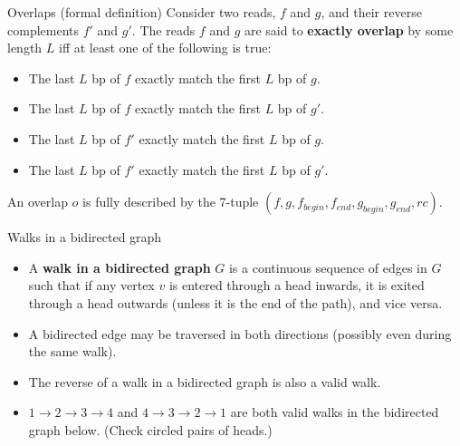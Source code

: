 \documentclass[xcolor=dvipsnames]{beamer}
\newcommand{\LengthVar}{L}
\begin{document}
\begin{frame}{Overlaps (formal definition)}
    Consider two reads, $f$ and $g$, and their reverse complements $f'$ and $g'$.
    The reads $f$ and $g$ are said to {\bf exactly overlap} by some length
    $\LengthVar$ iff at least one of the following is true:
    \begin{itemize}
        \item The last $\LengthVar$ bp of $f$ exactly match the first
        $\LengthVar$ bp of $g$.
        \item The last $\LengthVar$ bp of $f$ exactly match the first
        $\LengthVar$ bp of $g'$.
        \item The last $\LengthVar$ bp of $f'$ exactly match the first
        $\LengthVar$ bp of $g$.
        \item The last $\LengthVar$ bp of $f'$ exactly match the first
        $\LengthVar$ bp of $g'$.
    \end{itemize}
    An overlap $o$ is fully described by the 7-tuple $(f, g, f_{begin}, f_{end},
    g_{begin}, g_{end}, rc)$.
\end{frame}

\begin{frame}{Walks in a bidirected graph}
    \begin{itemize}
        \item A {\bf walk in a bidirected graph} $G$ is a continuous sequence of
        edges in $G$ such that if any vertex $v$ is entered through a head
        inwards, it is exited through a head outwards (unless it is the end of the
        path), and vice versa.
        \item A bidirected edge may be traversed in both directions
        (possibly even during the same walk).
        \item The reverse of a walk in a bidirected graph is also a
        valid walk.
        \item $1 \to 2 \to 3 \to 4$ and $4 \to 3 \to 2 \to 1$ are both valid
        walks in the bidirected graph below.  (Check circled pairs of
        heads.)
    \end{itemize}
        \begin{center} {\small
         } \end{center}
\end{frame}
\end{document}

